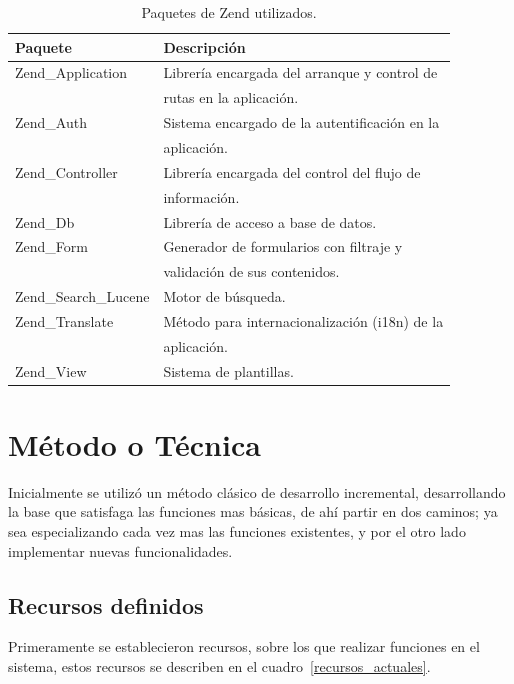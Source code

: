 \documentclass[letter,12pt]{article}
\begin{document}
\begin{table}
\begin{tabular}{l|l}
Paquete               & Descripción                                \\
\hline
Zend\_Application     & Librería encargada del arranque y control de \\
                      & rutas en la aplicación.                       \\
Zend\_Auth            & Sistema encargado de la autentificación en la  \\
                      & aplicación.                                     \\
Zend\_Controller      & Librería encargada del control del flujo de      \\
                      & información.                                      \\
Zend\_Db              & Librería de acceso a base de datos.                \\
Zend\_Form            & Generador de formularios con filtraje y             \\
                      & validación de sus contenidos.                        \\
Zend\_Search\_Lucene  & Motor de búsqueda.                                    \\
Zend\_Translate       & Método para internacionalización (i18n) de la          \\
                      & aplicación.                                             \\
Zend\_View            & Sistema de plantillas.                                   \\
\end{tabular}
\caption{Paquetes de Zend utilizados.}
\label{herramientas_zend}
\end{table}

\section{Método o Técnica}
Inicialmente se utilizó un método clásico de desarrollo incremental, de\-sa\-rro\-llan\-do la
base que satisfaga las funciones mas básicas, de ahí partir en dos caminos; ya sea especializando
cada vez mas las funciones existentes, y por el otro lado implementar nuevas funcionalidades.

\subsection{Recursos definidos}
Primeramente se establecieron recursos, sobre los que realizar funciones en el sistema, estos
recursos se describen en el cuadro~\ref{recursos_actuales}.
\end{document}
